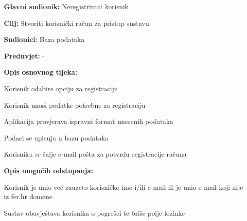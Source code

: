 					
					\noindent {}
					\begin{packed_item}
						
						\item \textbf{Glavni sudionik: }Neregistrirani korisnik
						\item  \textbf{Cilj:} Stvoriti korisnički račun za pristup sustavu
						\item  \textbf{Sudionici:} Baza podataka
						\item  \textbf{Preduvjet:} -
						\item  \textbf{Opis osnovnog tijeka:}
						
						\item[] \begin{packed_enum}
							\item Korisnik odabire opciju za registraciju
							\item Korisnik unosi podatke potrebne za registraciju
							\item Aplikacija provjerava ispravni format unesenih podataka
							\item Podaci se upisuju u bazu podataka
							\item Korisniku se šalje e-mail pošta za potvrdu registracije računa
						\end{packed_enum}
						
						\item  \textbf{Opis mogućih odstupanja:}
						
						\item[] \begin{packed_item}
							
							\item[2.a] Korisnik je unio već zauzeto korisničko ime i/ili e-mail ili je unio e-mail koji nije iz fer.hr domene 
							\item[] \begin{packed_enum}
								\item Sustav obavještava korisnika o pogrešci te briše polje lozinke
							\end{packed_enum}

						\end{packed_item}
					\end{packed_item}
				
	
				
